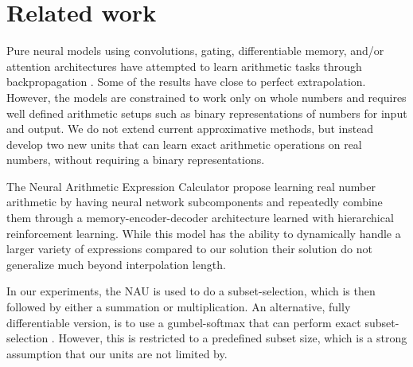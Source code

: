 \section{Related work}
Pure neural models using convolutions, gating, differentiable memory, and/or attention architectures have attempted to learn arithmetic tasks through backpropagation \cite{NeuralGPU,GridLSTM,NTM}.
Some of the results have close to perfect extrapolation. However, the models are constrained to work only on whole numbers and requires well defined arithmetic setups such as binary representations of numbers for input and output.
We do not extend current approximative methods, but instead develop two new units that can learn exact arithmetic operations on real numbers, without requiring a binary representations.

The Neural Arithmetic Expression Calculator \cite{NAEC} propose learning real number arithmetic by having neural network subcomponents and repeatedly combine them through a memory-encoder-decoder architecture learned with hierarchical reinforcement learning.
While this model has the ability to dynamically handle a larger variety of expressions compared to our solution their solution do not generalize much beyond interpolation length.

In our experiments, the NAU is used to do a subset-selection, which is then followed by either a summation or multiplication.
An alternative, fully differentiable version, is to use a gumbel-softmax that can perform exact subset-selection \cite{DSS}.
However, this is restricted to a predefined subset size, which is a strong assumption that our units are not limited by.